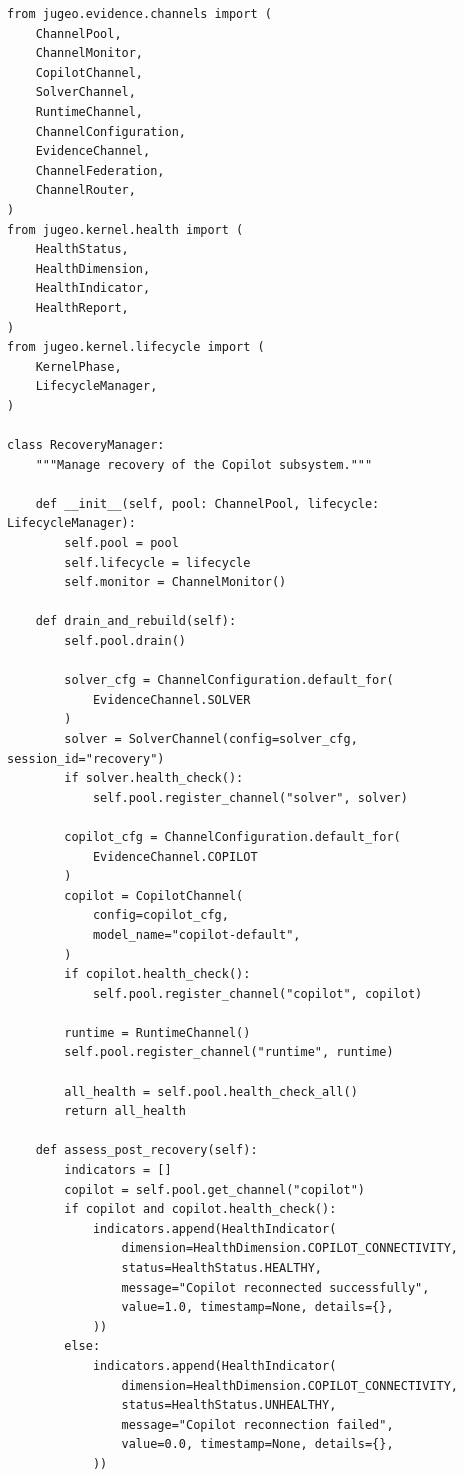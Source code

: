 \documentclass[11pt]{article}
\begin{document}
\begin{lstlisting}[style=jugeo-python,
  caption={Recovery workflow with pool drain and re-registration},
  label={lst:recovery}]
from jugeo.evidence.channels import (
    ChannelPool,
    ChannelMonitor,
    CopilotChannel,
    SolverChannel,
    RuntimeChannel,
    ChannelConfiguration,
    EvidenceChannel,
    ChannelFederation,
    ChannelRouter,
)
from jugeo.kernel.health import (
    HealthStatus,
    HealthDimension,
    HealthIndicator,
    HealthReport,
)
from jugeo.kernel.lifecycle import (
    KernelPhase,
    LifecycleManager,
)

class RecoveryManager:
    """Manage recovery of the Copilot subsystem."""

    def __init__(self, pool: ChannelPool, lifecycle: LifecycleManager):
        self.pool = pool
        self.lifecycle = lifecycle
        self.monitor = ChannelMonitor()

    def drain_and_rebuild(self):
        self.pool.drain()

        solver_cfg = ChannelConfiguration.default_for(
            EvidenceChannel.SOLVER
        )
        solver = SolverChannel(config=solver_cfg, session_id="recovery")
        if solver.health_check():
            self.pool.register_channel("solver", solver)

        copilot_cfg = ChannelConfiguration.default_for(
            EvidenceChannel.COPILOT
        )
        copilot = CopilotChannel(
            config=copilot_cfg,
            model_name="copilot-default",
        )
        if copilot.health_check():
            self.pool.register_channel("copilot", copilot)

        runtime = RuntimeChannel()
        self.pool.register_channel("runtime", runtime)

        all_health = self.pool.health_check_all()
        return all_health

    def assess_post_recovery(self):
        indicators = []
        copilot = self.pool.get_channel("copilot")
        if copilot and copilot.health_check():
            indicators.append(HealthIndicator(
                dimension=HealthDimension.COPILOT_CONNECTIVITY,
                status=HealthStatus.HEALTHY,
                message="Copilot reconnected successfully",
                value=1.0, timestamp=None, details={},
            ))
        else:
            indicators.append(HealthIndicator(
                dimension=HealthDimension.COPILOT_CONNECTIVITY,
                status=HealthStatus.UNHEALTHY,
                message="Copilot reconnection failed",
                value=0.0, timestamp=None, details={},
            ))


\end{lstlisting}
\end{document}
